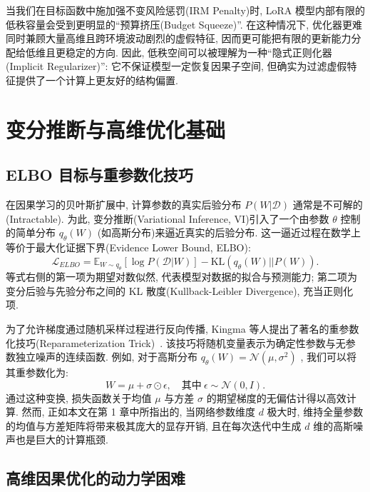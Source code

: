 \documentclass[a4paper,punct=banjiao,twoside]{ctexrep}
\theoremstyle{plain}
\theoremstyle{definition}
\theoremstyle{remark}
\begin{document}
当我们在目标函数中施加强不变风险惩罚(IRM Penalty)时, LoRA 模型内部有限的低秩容量会受到更明显的“预算挤压(Budget Squeeze)”. 在这种情况下, 优化器更难同时兼顾大量高维且跨环境波动剧烈的虚假特征, 因而更可能把有限的更新能力分配给低维且更稳定的方向. 因此, 低秩空间可以被理解为一种“隐式正则化器(Implicit Regularizer)”: 它不保证模型一定恢复因果子空间, 但确实为过滤虚假特征提供了一个计算上更友好的结构偏置.

\section{变分推断与高维优化基础}

\subsection{ELBO 目标与重参数化技巧}

在因果学习的贝叶斯扩展中, 计算参数的真实后验分布 $P(W|\mathcal{D})$ 通常是不可解的(Intractable). 为此, 变分推断(Variational Inference, VI)引入了一个由参数 $\theta$ 控制的简单分布 $q_\theta(W)$ (如高斯分布)来逼近真实的后验分布. 这一逼近过程在数学上等价于最大化证据下界(Evidence Lower Bound, ELBO):
\begin{equation}
    \mathcal{L}_{ELBO} = \mathbb{E}_{W \sim q_\theta}[\log P(\mathcal{D}|W)] - \text{KL}(q_\theta(W) || P(W)).
\end{equation}
等式右侧的第一项为期望对数似然, 代表模型对数据的拟合与预测能力; 第二项为变分后验与先验分布之间的 KL 散度(Kullback-Leibler Divergence), 充当正则化项. 

为了允许梯度通过随机采样过程进行反向传播, Kingma 等人提出了著名的重参数化技巧(Reparameterization Trick)~\cite{kingma2013auto}. 该技巧将随机变量表示为确定性参数与无参数独立噪声的连续函数. 例如, 对于高斯分布 $q_\theta(W) = \mathcal{N}(\mu, \sigma^2)$ , 我们可以将其重参数化为:
\begin{equation}
    W = \mu + \sigma \odot \epsilon, \quad \text{其中} \ \epsilon \sim \mathcal{N}(0, I).
\end{equation}
通过这种变换, 损失函数关于均值 $\mu$ 与方差 $\sigma$ 的期望梯度的无偏估计得以高效计算. 然而, 正如本文在第 1 章中所指出的, 当网络参数维度 $d$ 极大时, 维持全量参数的均值与方差矩阵将带来极其庞大的显存开销, 且在每次迭代中生成 $d$ 维的高斯噪声也是巨大的计算瓶颈.

\subsection{高维因果优化的动力学困难}
\end{document}
